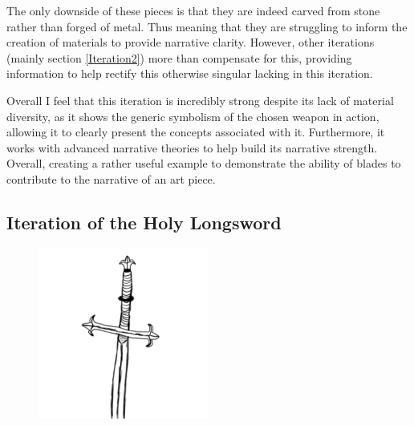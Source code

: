 \documentclass{article}
\begin{document}
The only downside of these pieces is that they are indeed carved from stone rather than forged of metal. Thus meaning that they are struggling to inform the creation of materials to provide narrative clarity. However, other iterations (mainly section \ref{Iteration2}) more than compensate for this, providing information to help rectify this otherwise singular lacking in this iteration.

Overall I feel that this iteration is incredibly strong despite its lack of material diversity, as it shows the generic symbolism of the chosen weapon in action, allowing it to clearly present the concepts associated with it. Furthermore, it works with advanced narrative theories to help build its narrative strength. Overall, creating a rather useful example to demonstrate the ability of blades to contribute to the narrative of an art piece.

\pagebreak

\subsection{Iteration of the Holy Longsword} \label{Iteration5}

\begin{figure}[h]
    \centering
    \caption{}
    \includegraphics[width=0.5\textwidth]{drawings/HolyLongsword.png}
    \label{fig:HolyLongsword}
\end{figure}
\end{document}
